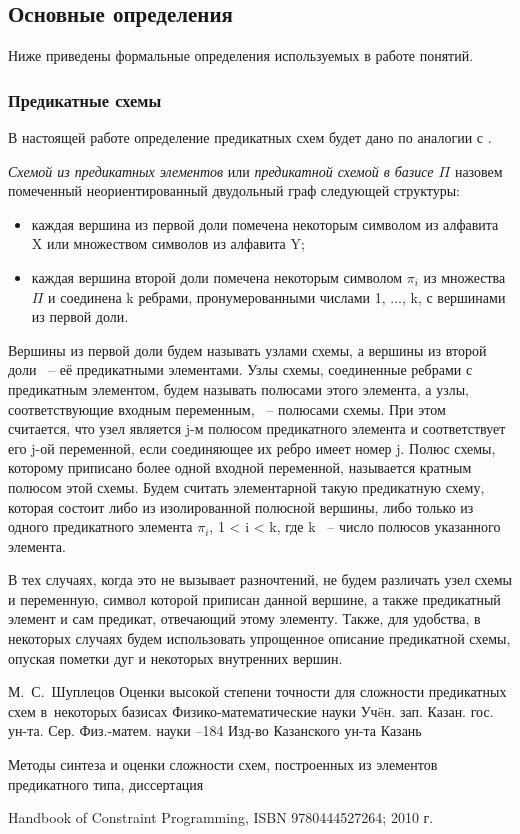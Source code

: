 \documentclass[12pt]{article}
\begin{document}
\subsection{Основные определения}
Ниже приведены формальные определения используемых в работе понятий.

\subsubsection*{Предикатные схемы}

В настоящей работе определение предикатных схем будет дано по аналогии с \cite{Shu11}.

\textit{Схемой из предикатных элементов} или \textit{предикатной схемой в базисе $\Pi$} назовем помеченный
неориентированный двудольный граф следующей структуры:

\begin{itemize}
\item каждая вершина из первой доли помечена некоторым символом из алфавита X или 
множеством символов из алфавита Y; 

\item каждая вершина второй доли помечена некоторым символом $\pi_i$ из множества $\Pi$ и 
соединена k ребрами, пронумерованными числами 1, ..., k, с вершинами из первой доли.
\end{itemize}
Вершины из первой доли будем называть узлами схемы, а вершины из второй доли ~-- её предикатными элементами. 
Узлы схемы, соединенные ребрами с предикатным элементом, будем называть полюсами этого элемента, 
а узлы, соответствующие входным переменным, ~-- полюсами схемы.
При этом считается, что узел является j-м полюсом предикатного элемента и соответствует 
его j-ой переменной, если соединяющее их ребро имеет номер j. Полюс схемы, которому приписано 
более одной входной переменной, называется кратным полюсом этой схемы. 
Будем считать элементарной такую предикатную схему, которая состоит либо из изолированной полюсной вершины, 
либо только из одного предикатного элемента $\pi_i$, 1 < i < k, где k ~-- число полюсов указанного элемента.

В тех случаях, когда это не вызывает разночтений, 
не будем различать узел схемы и переменную, 
символ которой приписан данной вершине, а также предикатный элемент и сам предикат, отвечающий этому элементу. 
Также, для удобства, в некоторых случаях будем использовать упрощенное описание предикатной схемы, 
опуская пометки дуг и некоторых внутренних вершин. 


\clearpage
{}
    \by М.~С.~Шуплецов
    \paper Оценки высокой степени точности для сложности предикатных схем в~некоторых базисах
    \inbook Физико-математические науки
    \serial Уч\"eн. зап. Казан. гос. ун-та. Сер. Физ.-матем. науки
    --184
    \publ Изд-во Казанского ун-та
    \publaddr Казань

Методы синтеза и оценки сложности схем, построенных из элементов предикатного типа, диссертация

 Handbook of Constraint Programming, ISBN 9780444527264; 2010 г.
\endthebibliography
\end{document}
